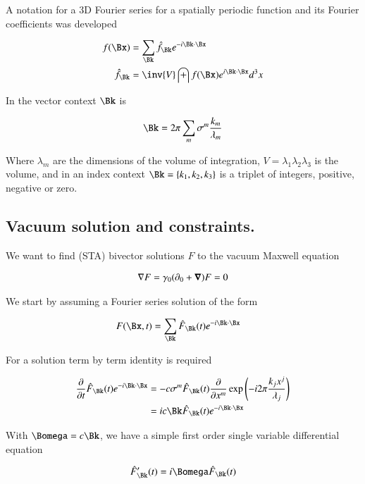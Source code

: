 \documentclass{article}
\begin{document}
A notation for a 3D Fourier series for a spatially periodic function and its Fourier coefficients was developed

\begin{align}
f(\Bx) &= \sum_{\Bk} \hat{f}_{\Bk} e^{ - i \Bk \cdot \Bx } \\
\hat{f}_{\Bk} &= \inv{V} \int f(\Bx) e^{ i \Bk \cdot \Bx } d^3 x
\end{align}

In the vector context $\Bk$ is

\begin{align}
\Bk = 2 \pi \sum_m \sigma^m \frac{k_m}{\lambda_m}
\end{align}

Where $\lambda_m$ are the dimensions of the volume of integration,
$V = \lambda_1 \lambda_2 \lambda_3$ is the volume, and
in an index context $\Bk = \{k_1, k_2, k_3\}$ is a triplet of integers,
positive, negative or zero.

\subsection{ Vacuum solution and constraints. }

We want to find (STA) bivector solutions $F$ to the vacuum Maxwell equation

\begin{align}\label{eqn:maxwell}
\nabla F = \gamma_0 (\partial_0 + \boldsymbol{\nabla}) F = 0
\end{align}

We start by assuming a Fourier series solution of the form

\begin{align}
F(\Bx,t) &= \sum_{\Bk} \hat{F}_{\Bk}(t) e^{-i \Bk \cdot \Bx}
\end{align}

For a solution term by term identity is required

\begin{align*}
\PD{t}{} \hat{F}_{\Bk}(t) e^{-i \Bk \cdot \Bx}
&= -c \sigma^m \hat{F}_{\Bk}(t) \PD{x^m}{} \exp\left(-i 2 \pi \frac{k_j x^j}{ \lambda_j}\right) \\
&= i c \Bk \hat{F}_{\Bk}(t) e^{-i \Bk \cdot \Bx}
\end{align*}

With $\Bomega = c \Bk$, we have a simple first order single variable differential equation

\begin{align*}
\hat{F}_{\Bk}'(t) = i \Bomega \hat{F}_{\Bk}(t)
\end{align*}
\end{document}

